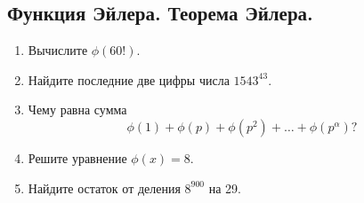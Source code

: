 \documentclass[11pt]{article}
\begin{document}
    \subsection*{Функция Эйлера. Теорема Эйлера.}
    \begin{enumerate}[start=50,label={\bfseries \arabic*.}]
        \item Вычислите $\phi(60!)$.

        \item Найдите последние две цифры числа  $1543^{43}$.

        \item Чему равна сумма
              \[ \phi(1) + \phi(p) + \phi(p^2) + \ldots + \phi(p^{\alpha})? \]

        \item Решите уравнение $\phi(x) = 8$.

        \item Найдите остаток от деления $8^{900}$ на 29.
    \end{enumerate}
\end{document}
